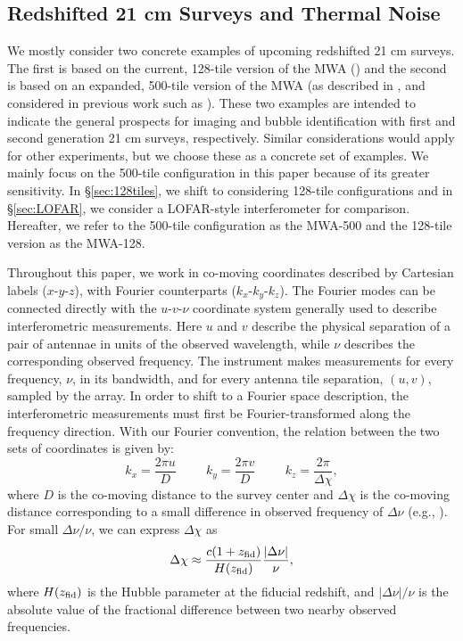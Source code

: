 \subsection{Redshifted 21 cm Surveys and Thermal Noise} \label{sec:noise}

We mostly consider two concrete examples of upcoming 
redshifted 21 cm surveys. The first is based on the current, 128-tile version of the
MWA (\citealt{Tingay:2012ps}) and the second is based on an expanded, 500-tile version
of the MWA (as described in
\citealt{Lonsdale:2009cb}, and considered in previous work such as \citealt{McQuinn:2005hk, Lidz:2007az}).
These two examples are intended to indicate the general prospects for imaging and bubble identification with
first and second generation 21 cm surveys, respectively. Similar considerations would apply
for other experiments, but we choose these as a concrete set of examples.
We mainly focus on the 500-tile configuration in this paper because of its greater sensitivity. In 
\S\ref{sec:128tiles}, we shift to considering 128-tile configurations
and in \S\ref{sec:LOFAR}, we consider a LOFAR-style interferometer for comparison. Hereafter, we refer
to the 500-tile configuration as the MWA-500 and the 128-tile version as the MWA-128.

Throughout this paper, we work in co-moving coordinates described by Cartesian
labels ($x$-$y$-$z$), with Fourier counterparts ($k_x$-$k_y$-$k_z$). The Fourier
modes can be connected directly with the $u$-$v$-$\nu$ coordinate system generally
used to describe interferometric measurements. Here $u$ and
$v$ describe the physical separation of a pair of antennae in units of
the observed wavelength, while $\nu$ describes the corresponding
observed frequency. The instrument makes measurements for every frequency, $\nu$, in
its bandwidth, and for every antenna tile separation, $(u,v)$, sampled by the
array. In order to shift to a
Fourier space description, the interferometric measurements must first be Fourier-transformed
along the frequency direction. 
With our Fourier convention, the relation between the two sets of coordinates
is given by:
\begin{equation}
k_{x} = \frac{2\pi u}{D} \hspace{1cm} k_{y} = \frac{2\pi
  v}{D} \hspace{1cm} k_z = \frac{2\pi}{\Delta \chi}, 
\label{eq:UtoK}\end{equation}
where $D$ is the co-moving distance to the survey center and $\Delta
\chi$ is the co-moving distance corresponding to a small difference in observed
frequency of $\Delta \nu$ (e.g., \citealt{Liu:2009qga}). For small $\Delta \nu/\nu$, we can express $\Delta \chi$ as
\begin{equation}
\Delta \chi \approx \frac{c (1 + z_{\rm fid})}{H(z_{\text{fid}})} \frac{|\Delta
  \nu|}{\nu},
\end{equation}
where $H(z_{\rm fid})$ is the Hubble parameter at the fiducial
redshift, and $|\Delta \nu|/\nu$ is the absolute value of the fractional difference between two nearby observed frequencies.


